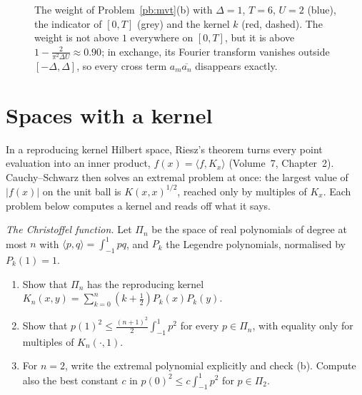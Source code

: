 \begin{figure}[ht]
\centering
{}
\caption{The weight of Problem~\ref{pb:mvt}(b) with $\Delta=1$, $T=6$, $U=2$ (blue), the indicator of $[0,T]$ (grey) and the kernel $k$ (red, dashed). The
weight is not above $1$ everywhere on $[0,T]$, but it is above $1-\frac2{\pi^2\Delta U}\approx0.90$; in exchange, its Fourier transform vanishes outside
$[-\Delta,\Delta]$, so every cross term $a_m\overline{a_n}$ disappears exactly.}\label{fig:majorant}
\end{figure}

\section{Spaces with a kernel}

In a reproducing kernel Hilbert space, Riesz's theorem turns every point evaluation into an inner product, $f(x)=\langle f,K_x\rangle$
(Volume~7, Chapter~2). Cauchy--Schwarz then solves an extremal problem at once: the largest value of $|f(x)|$ on the unit ball is
$K(x,x)^{1/2}$, reached only by multiples of $K_x$. Each problem below computes a kernel and reads off what it says.

\begin{exercise}[$\star$]\label{pb:christoffel}
\emph{The Christoffel function.} Let $\Pi_n$ be the space of real polynomials of degree at most $n$ with $\langle p,q\rangle=\int_{-1}^1pq$, and $P_k$ the
Legendre polynomials, normalised by $P_k(1)=1$.
\begin{enumerate}[label=(\alph*)]
\item Show that $\Pi_n$ has the reproducing kernel $K_n(x,y)=\sum_{k=0}^n(k+\frac12)P_k(x)P_k(y)$.
\item Show that $p(1)^2\le\frac{(n+1)^2}2\int_{-1}^1p^2$ for every $p\in\Pi_n$, with equality only for multiples of $K_n(\cdot,1)$.
\item For $n=2$, write the extremal polynomial explicitly and check (b). Compute also the best constant $c$ in $p(0)^2\le c\int_{-1}^1p^2$ for $p\in\Pi_2$.
\end{enumerate}
\end{exercise}

